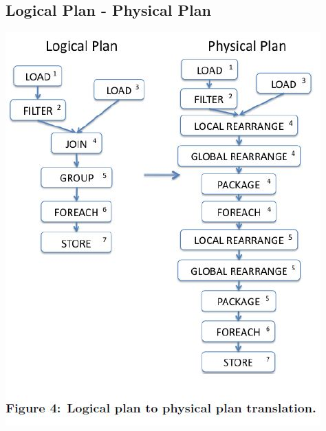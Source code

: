 \subsection{Logical Plan - Physical Plan}
\begin{frame}
\centerline{\includegraphics[scale=0.40]{Images/Logical_Physical.JPG} }
\let\thefootnote\relax{}
\end{frame}